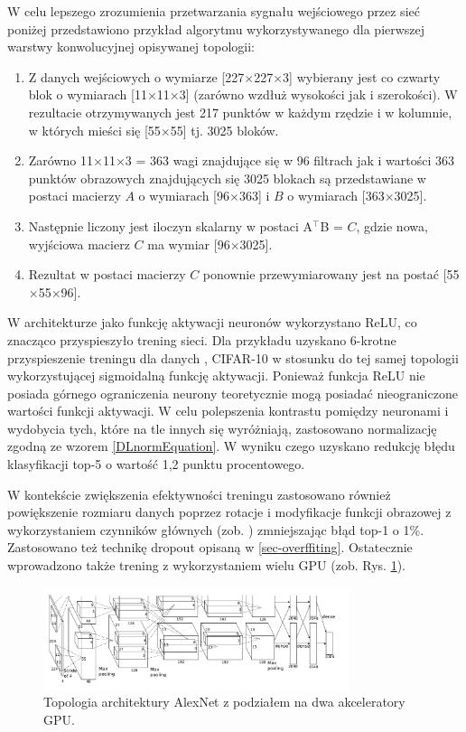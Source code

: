 W celu lepszego zrozumienia przetwarzania sygnału wejściowego przez sieć poniżej przedstawiono przykład algorytmu wykorzystywanego dla pierwszej warstwy konwolucyjnej opisywanej topologii: 
\begin{enumerate}
\item Z danych wejściowych o wymiarze [227$\times$227$\times$3] wybierany jest co czwarty blok  o wymiarach [11$\times$11$\times$3] (zarówno wzdłuż wysokości jak i szerokości). W rezultacie otrzymywanych jest 217 punktów w każdym rzędzie i w kolumnie, w których mieści się [55$\times$55] tj. 3025 bloków.
\item Zarówno 11$\times$11$\times$3 = 363 wagi znajdujące się w 96 filtrach jak i wartości 363 punktów obrazowych znajdujących się 3025 blokach są przedstawiane w postaci macierzy $A$ o wymiarach [96$\times$363] i $B$ o wymiarach [363$\times$3025].
\item Następnie liczony jest iloczyn skalarny w postaci A$^\intercal$B = $C$, gdzie nowa, wyjściowa macierz $C$ ma wymiar [96$\times$3025].
\item Rezultat w postaci macierzy $C$ ponownie przewymiarowany jest na postać [55$\times$55$\times$96].  
\end{enumerate} 

W architekturze jako funkcję aktywacji neuronów wykorzystano ReLU, co znacząco przyspieszyło trening sieci. Dla przykładu uzyskano 6-krotne przyspieszenie treningu dla danych \cite{CIFAR}, CIFAR-10 w stosunku do tej samej topologii wykorzystującej sigmoidalną funkcję aktywacji. Ponieważ funkcja ReLU nie posiada górnego ograniczenia neurony teoretycznie mogą posiadać nieograniczone wartości funkcji aktywacji. W celu polepszenia kontrastu pomiędzy neuronami i wydobycia tych, które na tle innych się wyróżniają, zastosowano normalizację zgodną ze wzorem \ref{DLnormEquation}. W wyniku czego uzyskano redukcję błędu klasyfikacji top-5 o wartość 1,2 punktu procentowego.

W kontekście zwiększenia efektywności treningu zastosowano również powiększenie rozmiaru danych poprzez rotacje i modyfikacje funkcji obrazowej z wykorzystaniem czynników głównych (zob. \cite{Krizhevsky2012}) zmniejszając błąd top-1 o 1\%. Zastosowano też technikę dropout opisaną w \ref{sec-overffiting}. Ostatecznie wprowadzono także trening z wykorzystaniem wielu GPU (zob. Rys. \ref{AlexNetTopologyMultiGPU}). 

\begin{figure}[h!]
	\centering
	\includegraphics[width=0.8\textwidth]{figures/AlexNet-multiGPU.png}
	\caption{Topologia architektury AlexNet z podziałem na dwa akceleratory GPU.}
	\label{AlexNetTopologyMultiGPU}
\end{figure}


